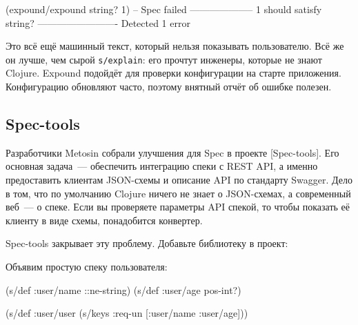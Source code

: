 \begin{english}
  \begin{clojure}
(expound/expound string? 1)
-- Spec failed --------------------
  1
should satisfy
  string?
-------------------------
Detected 1 error
  \end{clojure}
\end{english}


Это всё ещё машинный текст, который нельзя показывать пользователю. Всё же он
лучше, чем сырой \verb|s/explain|: его прочтут инженеры, которые не знают
Clojure. Expound подойдёт для проверки конфигурации на старте
приложения. Конфигурацию обновляют часто, поэтому внятный отчёт об ошибке
полезен.


\subsection*{Spec-tools}

Разработчики Metosin собрали улучшения для Spec в проекте
[Spec-tools]. Его
основная задача~--- обеспечить интеграцию спеки с REST API, а именно
предоставить клиентам JSON-схемы и описание API по стандарту Swagger. Дело в
том, что по умолчанию Clojure ничего не знает о JSON-схемах, а современный
веб~--- о спеке. Если вы проверяете параметры API спекой, то чтобы показать её
клиенту в виде схемы, понадобится конвертер.

Spec-tools закрывает эту проблему. Добавьте библиотеку в проект:

\begin{english}
  \begin{clojure}
  \end{clojure}
\end{english}

Объявим простую спеку пользователя:

\begin{english}
  \begin{clojure}
(s/def :user/name ::ne-string)
(s/def :user/age pos-int?)

(s/def :user/user
  (s/keys :req-un [:user/name :user/age]))
  \end{clojure}
\end{english}

